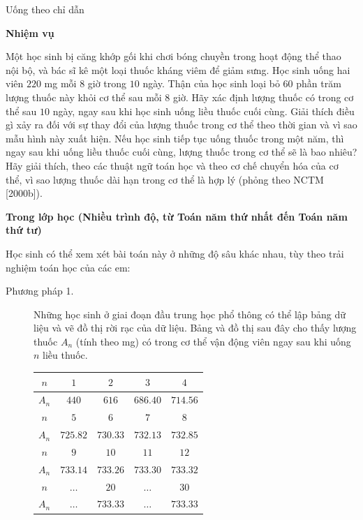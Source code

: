   {
    Uống theo chỉ dẫn
  }
  {
    \textbf{Nhiệm vụ}

    Một học sinh bị căng khớp gối khi chơi bóng chuyền trong hoạt động thể thao nội bộ, và bác sĩ kê một loại thuốc kháng viêm để giảm sưng. Học sinh uống hai viên $220$ mg mỗi $8$ giờ trong $10$ ngày. Thận của học sinh loại bỏ $60$ phần trăm lượng thuốc này khỏi cơ thể sau mỗi $8$ giờ. Hãy xác định lượng thuốc có trong cơ thể sau $10$ ngày, ngay sau khi học sinh uống liều thuốc cuối cùng. Giải thích điều gì xảy ra đối với sự thay đổi của lượng thuốc trong cơ thể theo thời gian và vì sao mẫu hình này xuất hiện. Nếu học sinh tiếp tục uống thuốc trong một năm, thì ngay sau khi uống liều thuốc cuối cùng, lượng thuốc trong cơ thể sẽ là bao nhiêu? Hãy giải thích, theo các thuật ngữ toán học và theo cơ chế chuyển hóa của cơ thể, vì sao lượng thuốc dài hạn trong cơ thể là hợp lý (phỏng theo NCTM [2000b]).\vspace{\baselineskip}

    \textbf{Trong lớp học (Nhiều trình độ, từ Toán năm thứ nhất đến Toán năm thứ tư)}

    Học sinh có thể xem xét bài toán này ở những độ sâu khác nhau, tùy theo trải nghiệm toán học của các em:

    \begin{description}
      \item[Phương pháp 1.] Những học sinh ở giai đoạn đầu trung học phổ thông có thể lập bảng dữ liệu và vẽ đồ thị rời rạc của dữ liệu. Bảng và đồ thị sau đây cho thấy lượng thuốc $A_n$ (tính theo mg) có trong cơ thể vận động viên ngay sau khi uống $n$ liều thuốc.\vspace{\baselineskip}
      
      \begin{center}
      \setlength{\tabcolsep}{5pt}
      \begin{tabular}{|c|c|c|c|c|}
      \hline
      $n$   & $1$      & $2$      & $3$      & $4$      \\
      \hline
      $A_n$ & $440$    & $616$    & $686.40$ & $714.56$ \\
      \hline
      $n$   & $5$      & $6$      & $7$      & $8$      \\
      \hline
      $A_n$ & $725.82$ & $730.33$ & $732.13$ & $732.85$ \\
      \hline
      $n$   & $9$      & $10$     & $11$     & $12$     \\
      \hline
      $A_n$ & $733.14$ & $733.26$ & $733.30$ & $733.32$ \\
      \hline
      $n$   & $\dots$  & $20$     & $\dots$  & $30$     \\
      \hline
      $A_n$ & $\dots$  & $733.33$ & $\dots$  & $733.33$ \\
      \hline
      \end{tabular}
      \end{center}


\end{description}}
